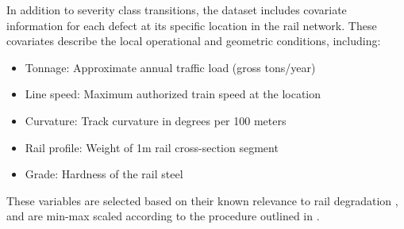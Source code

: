 In addition to severity class transitions, the dataset includes covariate information for each defect at its specific location in the rail network. These covariates describe the local operational and geometric conditions, including:

\begin{itemize}
    \item Tonnage: Approximate annual traffic load (gross tons/year)
    \item Line speed: Maximum authorized train speed at the location
    \item Curvature: Track curvature in degrees per 100 meters
    \item Rail profile: Weight of 1m rail cross-section segment
    \item Grade: Hardness of the rail steel
\end{itemize}

These variables are selected based on their known relevance to rail degradation \citep{ghofrani2019a,dick2003a,UIC_2002_defecthandbook,RASMUSSEN20178}, and are min-max scaled according to the procedure outlined in \citet{bisgaard2024A}.




